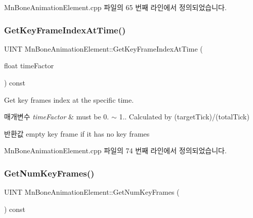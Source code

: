 Mn\+Bone\+Animation\+Element.\+cpp 파일의 65 번째 라인에서 정의되었습니다.

\mbox{\label{class_m_n_l_1_1_mn_bone_animation_element_ad22dfccb49a16ee30ab83c2ca0ca3185}} 
\subsubsection{\texorpdfstring{Get\+Key\+Frame\+Index\+At\+Time()}{GetKeyFrameIndexAtTime()}}
{\footnotesize\ttfamily U\+I\+NT Mn\+Bone\+Animation\+Element\+::\+Get\+Key\+Frame\+Index\+At\+Time (\begin{DoxyParamCaption}\item[{float}]{time\+Factor }\end{DoxyParamCaption}) const}

Get key frame\textquotesingle{}s index at the specific time. 
\begin{DoxyParams}{매개변수}
{\em time\+Factor} & must be 0. $\sim$ 1.. Calculated by (target\+Tick)/(total\+Tick) \\
\hline
\end{DoxyParams}
\begin{DoxyReturn}{반환값}
empty key frame if it has no key frames 
\end{DoxyReturn}


Mn\+Bone\+Animation\+Element.\+cpp 파일의 74 번째 라인에서 정의되었습니다.

\mbox{\label{class_m_n_l_1_1_mn_bone_animation_element_ac92bc52d44e187e00af032d5faa5c735}} 
\subsubsection{\texorpdfstring{Get\+Num\+Key\+Frames()}{GetNumKeyFrames()}}
{\footnotesize\ttfamily U\+I\+NT Mn\+Bone\+Animation\+Element\+::\+Get\+Num\+Key\+Frames (\begin{DoxyParamCaption}{ }\end{DoxyParamCaption}) const}



